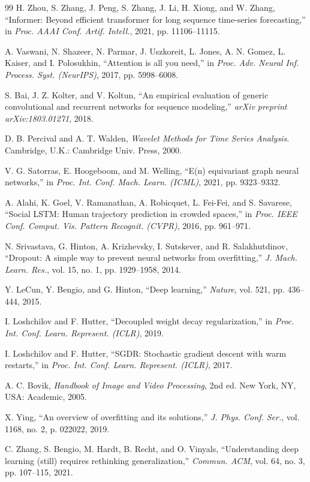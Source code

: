 \documentclass[letterpaper,journal]{IEEEtran}
\begin{document}
\begin{thebibliography}{99}
H. Zhou, S. Zhang, J. Peng, S. Zhang, J. Li, H. Xiong, and W. Zhang, ``Informer: Beyond efficient transformer for long sequence time-series forecasting,'' in \textit{Proc. AAAI Conf. Artif. Intell.}, 2021, pp. 11106--11115.

A. Vaswani, N. Shazeer, N. Parmar, J. Uszkoreit, L. Jones, A. N. Gomez, L. Kaiser, and I. Polosukhin, ``Attention is all you need,'' in \textit{Proc. Adv. Neural Inf. Process. Syst. (NeurIPS)}, 2017, pp. 5998--6008.

S. Bai, J. Z. Kolter, and V. Koltun, ``An empirical evaluation of generic convolutional and recurrent networks for sequence modeling,'' \textit{arXiv preprint arXiv:1803.01271}, 2018.

D. B. Percival and A. T. Walden, \textit{Wavelet Methods for Time Series Analysis}. Cambridge, U.K.: Cambridge Univ. Press, 2000.

V. G. Satorras, E. Hoogeboom, and M. Welling, ``E(n) equivariant graph neural networks,'' in \textit{Proc. Int. Conf. Mach. Learn. (ICML)}, 2021, pp. 9323--9332.

A. Alahi, K. Goel, V. Ramanathan, A. Robicquet, L. Fei-Fei, and S. Savarese, ``Social LSTM: Human trajectory prediction in crowded spaces,'' in \textit{Proc. IEEE Conf. Comput. Vis. Pattern Recognit. (CVPR)}, 2016, pp. 961--971.

N. Srivastava, G. Hinton, A. Krizhevsky, I. Sutskever, and R. Salakhutdinov, ``Dropout: A simple way to prevent neural networks from overfitting,'' \textit{J. Mach. Learn. Res.}, vol. 15, no. 1, pp. 1929--1958, 2014.

Y. LeCun, Y. Bengio, and G. Hinton, ``Deep learning,'' \textit{Nature}, vol. 521, pp. 436--444, 2015.

I. Loshchilov and F. Hutter, ``Decoupled weight decay regularization,'' in \textit{Proc. Int. Conf. Learn. Represent. (ICLR)}, 2019.

I. Loshchilov and F. Hutter, ``SGDR: Stochastic gradient descent with warm restarts,'' in \textit{Proc. Int. Conf. Learn. Represent. (ICLR)}, 2017.

A. C. Bovik, \textit{Handbook of Image and Video Processing}, 2nd ed. New York, NY, USA: Academic, 2005.

X. Ying, ``An overview of overfitting and its solutions,'' \textit{J. Phys. Conf. Ser.}, vol. 1168, no. 2, p. 022022, 2019.

C. Zhang, S. Bengio, M. Hardt, B. Recht, and O. Vinyals, ``Understanding deep learning (still) requires rethinking generalization,'' \textit{Commun. ACM}, vol. 64, no. 3, pp. 107--115, 2021.

\end{thebibliography}
\end{document}

